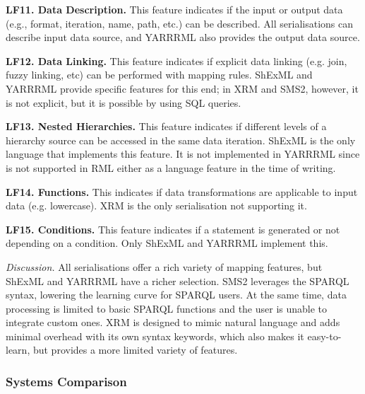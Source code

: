 \textbf{LF11. Data Description.}
This feature indicates if the input or output data (e.g., format, iteration, name, path, etc.) can be described. All serialisations can describe input data source, and YARRRML also provides the output data source.

\textbf{LF12. Data Linking.}
This feature indicates if explicit data linking (e.g. join, fuzzy linking, etc) can be performed with mapping rules. ShExML and YARRRML provide specific features for this end; in XRM and SMS2, however, it is not explicit, but it is possible by using SQL queries. 

\textbf{LF13. Nested Hierarchies.}
This feature indicates if different levels of a hierarchy source can be accessed in the same data iteration. ShExML is the only language that implements this feature. It is not implemented in YARRRML since is not supported in RML either as a language feature in the time of writing. 

\textbf{LF14. Functions.}
This indicates if data transformations are applicable to input data (e.g. lowercase). XRM is the only serialisation not supporting it. 

\textbf{LF15. Conditions.}
This feature indicates if a statement is generated or not depending on a condition. Only ShExML and YARRRML implement this.

\textit{Discussion.} 
All serialisations offer a rich variety of mapping features, but ShExML and YARRRML have a richer selection. SMS2 leverages the SPARQL syntax, lowering the learning curve for SPARQL users. At the same time, data processing is limited to basic SPARQL functions and the user is unable to integrate custom ones. 
XRM is designed to mimic natural language and adds minimal overhead with its own syntax keywords, which also makes it easy-to-learn, but provides a more limited variety of features.


\subsubsection{Systems Comparison} 




